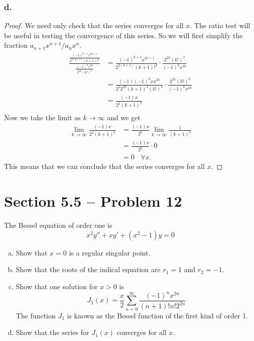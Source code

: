 \documentclass{article}
\theoremstyle{definition}
\begin{document}
        \subsubsection*{d.}
            \begin{proof}
                We need only check that the series converges for all $x$.
                The ratio test will be useful in testing the convergence of this series.
                So we will first simplify the fraction $a_{n+1}x^{n+1}/a_n x^n$.
                \begin{align*}
                    \frac{
                        \frac{(-1)^{k+1}x^{2k + 1}}{2^{2(k+1)}(k+1)!^2}
                    }{
                        \frac{(-1)^k x^{2k}}{2^{2k}(k!)^2}
                    } &= 
                        \frac{(-1)^{k+1}x^{2k + 1}}{2^{2(k+1)}(k+1)!^2}
                        \cdot \frac{2^{2k}(k!)^2}{(-1)^k x^{2k}} \\
                        &= \frac{(-1)(-1)^k x x^{2k}}{2^2 2^{2k}(k+1)^2(k!)^2} \cdot \frac{2^{2k}(k!)^2}{(-1)^k x^{2k}} \\
                        &= \frac{(-1)x}{2^2 (k+1)^2} \\
                \end{align*}
                Now we take the limit as $k\to \infty$ and we get 
                \begin{align*}
                    \lim_{k\to \infty} \frac{(-1)x}{2^2 (k+1)^2} &=
                    \frac{(-1)x}{2^2} \lim_{k\to \infty} \frac{1}{(k+1)^2} \\
                    &= \frac{(-1)x}{2^2} \cdot 0 \\
                    &= 0 \ \ \ \ \forall x
                .\end{align*}
                This means that we can conclude that the series converges for all $x$.
            \end{proof}
        \pagebreak
\section*{Section 5.5 -- Problem 12}
    The Bessel equation of order one is
    \[
    x^2 y'' + x y' + (x^2 - 1) y = 0
    \] 
    \begin{enumerate}[a.]
        \item Show that $x = 0$ is a regular singular point.
        \item Show that the roots of the indical equation are $r_1 = 1$ and $r_2 = -1$.
        \item Show that one solution for $x > 0$ is 
            \[
            J_1(x) = \frac{x}{2} \sum_{n=0}^{\infty} \frac{(-1)^n x^{2n}}{(n+1)!n!2^{2n}}
            \] 
        The function $J_1$ is known as the Bessel function of the first kind of order 1.
        \item Show that the series for $J_1(x)$ converges for all $x$.
    \end{enumerate}
    \\ \hline
\end{document}
